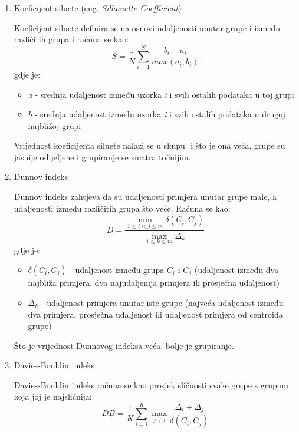 \documentclass[utf8, diplomski, numeric]{fer}
\begin{document}
\begin{enumerate}
\item Koeficijent siluete (eng. \textit{Silhouette Coefficient})

Koeficijent siluete definira se na osnovi udaljenosti unutar grupe i između različitih grupa i računa se kao:
\begin{equation*} \label{eq:silouette}
S = \frac{1}{N}\sum_{i=1}^{N}\frac{b_i-a_i}{max(a_i,b_i)} 
\end{equation*}
gdje je:
\begin{itemize}
\item \textit{a} - srednja udaljenost između uzorka \textit{i} i svih ostalih podataka u toj grupi
\item \textit{b} - srednja udaljenost između uzorka \textit{i} i svih ostalih podataka u drugoj najbližoj grupi
\end{itemize}

Vrijednost koeficijenta siluete nalazi se u skupu \begin{math}[-1,1] \end{math} i što je ona veća, grupe su jasnije odijeljene i grupiranje se smatra točnijim.

\item Dunnov indeks

Dunnov indeks zahtjeva da su udaljenosti primjera unutar grupe male, a udaljenosti između različitih grupa što veće. Računa se kao:
\begin{equation*} \label{eq:silouette}
D = \frac{\min_{1\leq i < j \leq m} \delta(C_i,C_j)}{\max_{1\leq k \leq m} \Delta_k}
\end{equation*}
gdje je:
\begin{itemize}
\item $\delta(C_i,C_j)$ - udaljenost između grupa $C_i$ i $C_j$ (udaljenost između dva najbliža primjera, dva najudaljenija primjera ili prosječna udaljenost)
\item $\Delta_k$ - udaljenost primjera unutar iste grupe (najveća udaljenost između dva primjera, prosječna udaljenost ili udaljenost primjera od centroida grupe)
\end{itemize}

Što je vrijednost Dunnovog indeksa veća, bolje je grupiranje.

\item Davies-Bouldin indeks

Davies-Bouldin indeks računa se kao prosjek sličnosti svake grupe s grupom koja joj je najsličnija: 
\begin{equation*} \label{eq:silouette}
DB = \frac{1}{K}\sum_{i = 1}^{K} \max_{j\neq i} \frac{\Delta_i + \Delta_j}{\delta(C_i,C_j)}
\end{equation*}


\end{enumerate}
\end{document}
